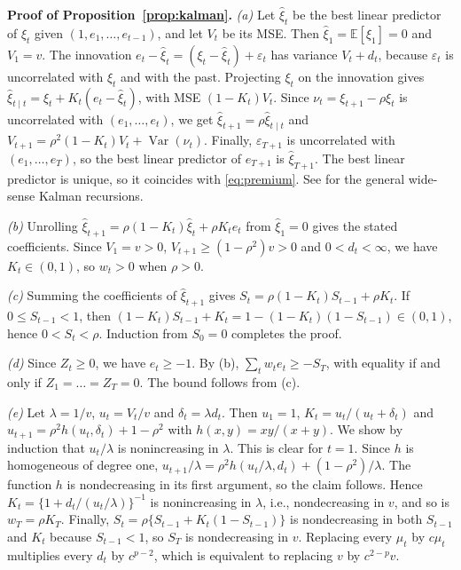 \documentclass[mathematics,article,submit,moreauthors]{Definitions/mdpi}
\DeclareMathOperator{\Var}{Var}
\newcommand{\E}{\mathbb{E}}
\begin{document}
\textbf{Proof of Proposition~\ref{prop:kalman}.}
\emph{(a)} Let $\hat\xi_t$ be the best linear predictor of $\xi_t$ given $(1,e_1,\dots,e_{t-1})$, and let $V_t$ be its MSE. Then $\hat\xi_1=\E[\xi_1]=0$ and $V_1=v$. The innovation $e_t-\hat\xi_t=(\xi_t-\hat\xi_t)+\varepsilon_t$ has variance $V_t+d_t$, because $\varepsilon_t$ is uncorrelated with $\xi_t$ and with the past. Projecting $\xi_t$ on the innovation gives $\hat\xi_{t\mid t}=\hat\xi_t+K_t(e_t-\hat\xi_t)$, with MSE $(1-K_t)V_t$. Since $\nu_t=\xi_{t+1}-\rho \xi_t$ is uncorrelated with $(e_1,\dots,e_t)$, we get $\hat\xi_{t+1}=\rho\hat\xi_{t\mid t}$ and $V_{t+1}=\rho^2(1-K_t)V_t+\Var(\nu_t)$. Finally, $\varepsilon_{T+1}$ is uncorrelated with $(e_1,\dots,e_T)$, so the best linear predictor of $e_{T+1}$ is $\hat\xi_{T+1}$. The best linear predictor is unique, so it coincides with \eqref{eq:premium}. See \citet[Proposition~12.2.2]{brockwell1991} for the general wide-sense Kalman recursions.

\emph{(b)} Unrolling $\hat\xi_{t+1}=\rho(1-K_t)\hat\xi_t+\rho K_te_t$ from $\hat\xi_1=0$ gives the stated coefficients. Since $V_1=v>0$, $V_{t+1}\ge(1-\rho^2)v>0$ and $0<d_t<\infty$, we have $K_t\in(0,1)$, so $w_t>0$ when $\rho>0$.

\emph{(c)} Summing the coefficients of $\hat\xi_{t+1}$ gives $S_t=\rho(1-K_t)S_{t-1}+\rho K_t$. If $0\le S_{t-1}<1$, then $(1-K_t)S_{t-1}+K_t=1-(1-K_t)(1-S_{t-1})\in(0,1)$, hence $0<S_t<\rho$. Induction from $S_0=0$ completes the proof.

\emph{(d)} Since $Z_t\ge0$, we have $e_t\ge-1$. By (b), $\sum_tw_te_t\ge-S_T$, with equality if and only if $Z_1=\dots=Z_T=0$. The bound follows from (c).

\emph{(e)} Let $\lambda=1/v$, $u_t=V_t/v$ and $\delta_t=\lambda d_t$. Then $u_1=1$, $K_t=u_t/(u_t+\delta_t)$ and $u_{t+1}=\rho^2h(u_t,\delta_t)+1-\rho^2$ with $h(x,y)=xy/(x+y)$. We show by induction that $u_t/\lambda$ is nonincreasing in $\lambda$. This is clear for $t=1$. Since $h$ is homogeneous of degree one, $u_{t+1}/\lambda=\rho^2h(u_t/\lambda,d_t)+(1-\rho^2)/\lambda$. The function $h$ is nondecreasing in its first argument, so the claim follows. Hence $K_t=\{1+d_t/(u_t/\lambda)\}^{-1}$ is nonincreasing in $\lambda$, i.e., nondecreasing in $v$, and so is $w_T=\rho K_T$. Finally, $S_t=\rho\{S_{t-1}+K_t(1-S_{t-1})\}$ is nondecreasing in both $S_{t-1}$ and $K_t$ because $S_{t-1}<1$, so $S_T$ is nondecreasing in $v$. Replacing every $\mu_t$ by $c\mu_t$ multiplies every $d_t$ by $c^{p-2}$, which is equivalent to replacing $v$ by $c^{2-p}v$.
\end{document}
